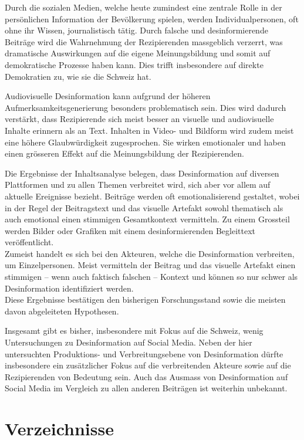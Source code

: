 \documentclass[12pt,a4paper]{article}        %
\begin{document}
Durch die sozialen Medien, welche heute zumindest eine zentrale Rolle in der persönlichen Information der Bevölkerung spielen, werden Individualpersonen, oft ohne ihr Wissen, journalistisch tätig. Durch falsche und desinformierende Beiträge wird die Wahrnehmung der Rezipierenden massgeblich verzerrt, was dramatische Auswirkungen auf die eigene Meinungsbildung und somit auf demokratische Prozesse haben kann. Dies trifft insbesondere auf direkte Demokratien zu, wie sie die Schweiz hat.

Audiovisuelle Desinformation kann aufgrund der höheren Aufmerksamkeitsgenerierung besonders problematisch sein. Dies wird dadurch verstärkt, dass Rezipierende sich meist besser an visuelle und audiovisuelle Inhalte erinnern als an Text. Inhalten in Video- und Bildform wird zudem meist eine höhere Glaubwürdigkeit zugesprochen. Sie wirken emotionaler und haben einen grösseren Effekt auf die Meinungsbildung der Rezipierenden.

Die Ergebnisse der Inhaltsanalyse belegen, dass Desinformation auf diversen Plattformen und zu allen Themen verbreitet wird, sich aber vor allem auf aktuelle Ereignisse bezieht. Beiträge werden oft emotionalisierend gestaltet, wobei in der Regel der Beitragstext und das visuelle Artefakt sowohl thematisch als auch emotional einen stimmigen Gesamtkontext vermitteln. Zu einem Grossteil werden Bilder oder Grafiken mit einem desinformierenden Begleittext veröffentlicht.\\
Zumeist handelt es sich bei den Akteuren, welche die Desinformation verbreiten, um Einzelpersonen. Meist vermitteln der Beitrag und das visuelle Artefakt einen stimmigen – wenn auch faktisch falschen – Kontext und können so nur schwer als Desinformation identifiziert werden.\\
Diese Ergebnisse bestätigen den bisherigen Forschungsstand sowie die meisten davon abgeleiteten Hypothesen.

Insgesamt gibt es bisher, insbesondere mit Fokus auf die Schweiz, wenig Untersuchungen zu Desinformation auf Social Media. Neben der hier untersuchten Produktions- und Verbreitungsebene von Desinformation dürfte insbesondere ein zusätzlicher Fokus auf die verbreitenden Akteure sowie auf die Rezipierenden von Bedeutung sein. Auch das Ausmass von Desinformation auf Social Media im Vergleich zu allen anderen Beiträgen ist weiterhin unbekannt.

\pagebreak
\section{Verzeichnisse}
\end{document}
